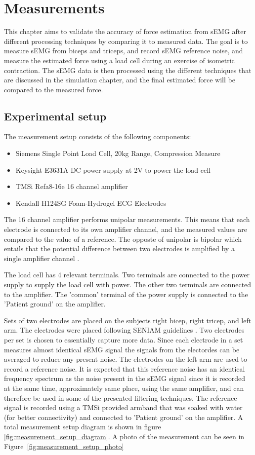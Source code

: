 \chapter{Measurements}
This chapter aims to validate the accuracy of force estimation from sEMG after different processing techniques by comparing it to measured data. The goal is to measure sEMG from biceps and triceps, and record sEMG reference noise, and measure the estimated force using a load cell during an exercise of isometric contraction. The sEMG data is then processed using the different techniques that are discussed in the simulation chapter, and the final estimated force will be compared to the measured force. 

\section{Experimental setup}
The measurement setup consists of the following components:
\begin{itemize}
    \item Siemens Single Point Load Cell, 20kg Range, Compression Measure
    \item Keysight E3631A DC power supply at 2V to power the load cell
    \item TMSi Refa8-16e 16 channel amplifier
    \item Kendall H124SG Foam-Hydrogel ECG Electrodes 
\end{itemize}

The 16 channel amplifier performs unipolar measurements. This means that each electrode is connected to its own amplifier channel, and the measured values are compared to the value of a reference. The opposte of unipolar is bipolar which entails that the potential difference between two electrodes is amplified by a single amplifier channel \cite{tmsi_unipolar_bipolar}. 

The load cell has 4 relevant terminals. Two terminals are connected to the power supply to supply the load cell with power. The other two terminals are connected to the amplifier. The 'common' terminal of the power supply is connected to the 'Patient ground' on the amplifier.

Sets of two electrodes are placed on the subjects right bicep, right tricep, and left arm. The electrodes were placed following SENIAM guidelines \cite{seniam}. Two electrodes per set is chosen to essentially capture more data. Since each electrode in a set measures almost identical sEMG signal the signals from the electordes can be averaged to reduce any present noise. The electrodes on the left arm are used to record a reference noise. It is expected that this reference noise has an identical frequency spectrum as the noise present in the sEMG signal since it is recorded at the same time, approximately same place, using the same amplifier, and can therefore be used in some of the presented filtering techniques. The reference signal is recorded using a TMSi provided armband that was soaked with water (for better connectivity) and connected to 'Patient ground' on the amplifier. A total measurement setup diagram is shown in figure \ref{fig:measurement_setup_diagram}. A photo of the measurement can be seen in Figure~\ref{fig:measurement_setup_photo}

